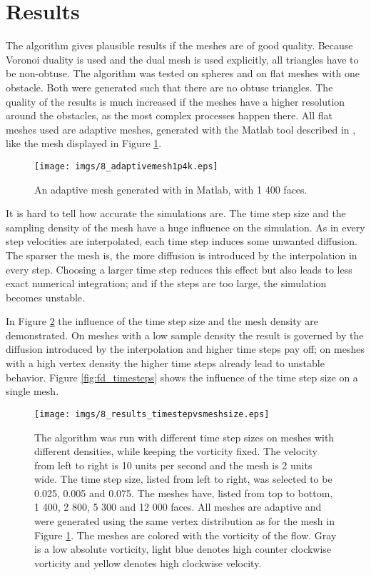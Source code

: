 \section{Results}

The algorithm gives plausible results if the meshes are of good quality. Because Voronoi duality is used and the dual mesh is used explicitly, all triangles have to be non-obtuse. The algorithm was tested on spheres and on flat meshes with one obstacle. Both  were generated such that there are no obtuse triangles. The quality of the results is much increased if the meshes have a higher resolution around the obstacles, as the most complex processes happen there. All flat meshes used are adaptive meshes, generated with the Matlab tool described in \cite{meshmatlab}, like the mesh displayed in Figure \ref{fig:fd_meshes}.


\begin{figure}%
\begin{center}
\texttt{[image: imgs/8\_adaptivemesh1p4k.eps]}%
\end{center}
\caption{An adaptive mesh generated with \cite{meshmatlab} in Matlab, with 1 400 faces.}%
\label{fig:fd_meshes}%
\end{figure}

It is hard to tell how accurate the simulations are. The time step size and the sampling density of the mesh have a huge influence on the simulation. As in every step velocities are interpolated, each time step induces some unwanted diffusion. The sparser the mesh is, the more diffusion is introduced by the interpolation in every step. Choosing a larger time step reduces this effect but also leads to less exact numerical integration; and if the steps are too large, the simulation becomes unstable. 

In Figure \ref{fig:fd_timevsmesh} the influence of the time step size and the mesh density are demonstrated. On meshes with a low sample density the result is governed by the diffusion introduced by the interpolation and higher time steps pay off; on meshes with a high vertex density the higher time steps already lead to unstable behavior. Figure \ref{fig:fd_timesteps} shows the influence of the time step size on a single mesh.


\begin{figure}%
\texttt{[image: imgs/8\_results\_timestepvsmeshsize.eps]}%
\caption{The algorithm was run with different time step sizes on meshes with different densities, while keeping the vorticity fixed. The velocity from left to right is 10 units per second and the mesh is 2 units wide. The time step size, listed from left to right, was selected to be 0.025, 0.005 and 0.075. The meshes have, listed from top to bottom, 1 400, 2 800, 5 300 and 12 000 faces. All meshes are adaptive and were generated using the same vertex distribution as for the mesh in Figure \ref{fig:fd_meshes}.
The meshes are colored with the vorticity of the flow. Gray is a low absolute vorticity, light blue denotes high counter clockwise vorticity and yellow denotes high clockwise velocity.
}%
\label{fig:fd_timevsmesh}%
\end{figure}

